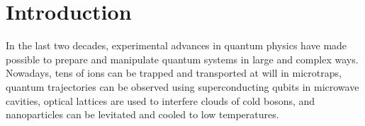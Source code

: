 \documentclass[12pt]{article}
\begin{document}


\newpage

\section{Introduction}

In the last two decades, experimental advances in quantum physics have made possible to prepare and manipulate quantum  systems  in   large  and  complex  ways.   Nowadays,  tens  of  ions  can  be  trapped  and  transported  at will in microtraps, quantum  trajectories  can  be  observed  using  superconducting  qubits  in  microwave  cavities, optical lattices are used to interfere clouds of cold bosons, and nanoparticles can be levitated and cooled to low temperatures\cite{quantum_trajectories,ions,ultracold_atoms,nanoparticles_levitated}.
\end{document}
